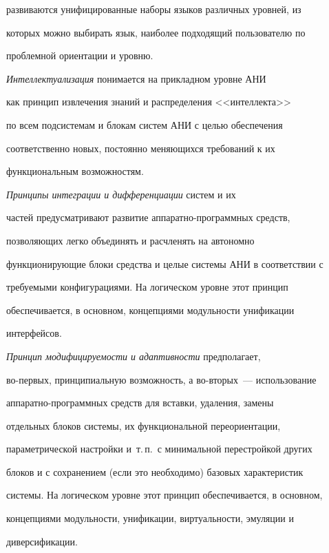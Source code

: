 развиваются унифицированные наборы языков различных уровней, из


которых можно выбирать язык, наиболее подходящий пользователю по


проблемной ориентации и уровню.





\textit{Интеллектуализация}  понимается на прикладном уровне АНИ


 как принцип извлечения знаний и распределения <<интеллекта>>


 по всем подсистемам и блокам систем АНИ с целью обеспечения


 соответственно новых, постоянно меняющихся требований к их


 функциональным возможностям.





\textit{Принципы интеграции и дифференциации} систем и их


частей  предусматривают развитие ап\-па\-рат\-но-прог\-рам\-мных средств,


позволяющих легко объединять и расчленять на автономно


функционирующие блоки средства и целые системы АНИ в соответствии с


требуемыми конфигурациями. На логическом уровне этот принцип


обеспечивается, в основном, концепциями модульности унификации


интерфейсов.





\textit{Принцип модифицируемости и адаптивности} предполагает,


во-пер\-вых, принципиальную возможность, а во-вто\-рых~--- использование


ап\-па\-рат\-но-про\-грам\-мных средств для вставки, удаления, замены


отдельных блоков сис\-те\-мы, их функциональной переориентации,


параметрической настройки и~т.\,п.\ с минимальной перестройкой других


блоков и с сохранением (если это необходимо) базовых характеристик


системы. На логическом уровне этот принцип обеспечивается, в основном,


концепциями модульности, унификации, виртуальности, эмуляции и


диверсификации.





